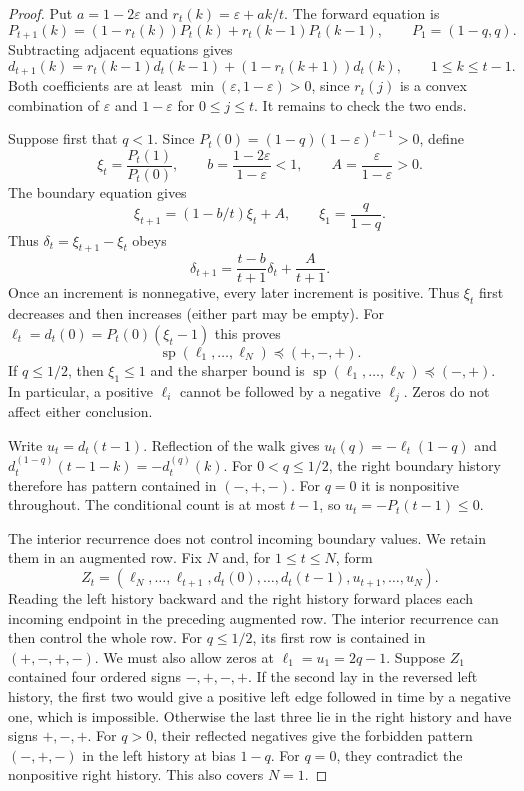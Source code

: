 \begin{proof}
Put $a=1-2\varepsilon$ and $r_t(k)=\varepsilon+ak/t$. The forward equation
is
\[
 P_{t+1}(k)=(1-r_t(k))P_t(k)+r_t(k-1)P_t(k-1),
 \qquad P_1=(1-q,q).
\]
Subtracting adjacent equations gives
\begin{equation}\label{eq:bias-first-diff}
 d_{t+1}(k)=r_t(k-1)d_t(k-1)+(1-r_t(k+1))d_t(k),
 \qquad 1\le k\le t-1.
\end{equation}
Both coefficients are at least $\min(\varepsilon,1-\varepsilon)>0$,
since $r_t(j)$ is a convex combination of $\varepsilon$ and
$1-\varepsilon$ for $0\le j\le t$. It remains to check the two ends.

Suppose first that $q<1$. Since
$P_t(0)=(1-q)(1-\varepsilon)^{t-1}>0$, define
\[
 \xi_t=\frac{P_t(1)}{P_t(0)},\qquad
 b=\frac{1-2\varepsilon}{1-\varepsilon}<1,\qquad
 A=\frac{\varepsilon}{1-\varepsilon}>0.
\]
The boundary equation gives
\[
 \xi_{t+1}=(1-b/t)\xi_t+A,\qquad \xi_1=\frac q{1-q}.
\]
Thus $\delta_t=\xi_{t+1}-\xi_t$ obeys
\begin{equation}\label{eq:bias-edge-increments}
 \delta_{t+1}=\frac{t-b}{t+1}\delta_t+\frac A{t+1}.
\end{equation}
Once an increment is nonnegative, every later increment is positive.
Thus $\xi_t$ first decreases and then increases (either part may be empty). For $\ell_t=d_t(0)=P_t(0)(\xi_t-1)$ this proves
\[
 \operatorname{sp}(\ell_1,\ldots,\ell_N)\preceq(+,-,+).
\]
If $q\le1/2$, then $\xi_1\le1$ and the sharper bound is
$\operatorname{sp}(\ell_1,\ldots,\ell_N)\preceq(-,+)$.
In particular, a positive $\ell_i$ cannot be followed by a negative
$\ell_j$. Zeros do not affect either conclusion.

Write $u_t=d_t(t-1)$. Reflection of the walk gives
$u_t(q)=-\ell_t(1-q)$ and
$d_t^{(1-q)}(t-1-k)=-d_t^{(q)}(k)$.
For $0<q\le1/2$, the right boundary history therefore has pattern
contained in $(-,+,-)$. For $q=0$ it is nonpositive throughout. The conditional count is at
most $t-1$, so $u_t=-P_t(t-1)\le0$.

The interior recurrence does not control incoming boundary values.
We retain them in an augmented row. Fix $N$ and, for $1\le t\le N$, form
\[
 Z_t=(\ell_N,\ldots,\ell_{t+1},
       d_t(0),\ldots,d_t(t-1),
       u_{t+1},\ldots,u_N).
\]
Reading the left history backward and the right history forward places
each incoming endpoint in the preceding augmented row. The interior
recurrence can then control the whole row.
For $q\le1/2$, its first row is contained in $(+,-,+,-)$.
We must also allow zeros at $\ell_1=u_1=2q-1$. Suppose $Z_1$
contained four ordered signs $-,+,-,+$. If the second lay in the
reversed left history, the first two would give
a positive left edge followed in time by a negative one, which is
impossible. Otherwise the last three lie in the right history and have
signs $+,-,+$. For $q>0$, their reflected negatives give the forbidden pattern
$(-,+,-)$ in the left history at bias $1-q$. For $q=0$, they contradict
the nonpositive right history. This also covers $N=1$.


\end{proof}
